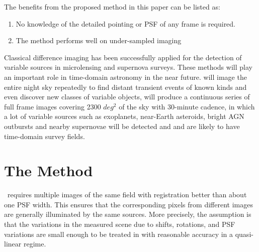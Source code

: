 The benefits from the proposed method in this paper can be listed as: 
\begin{enumerate}
\item No knowledge of the detailed pointing or PSF of any frame is required. 
\item The method performs well on under-sampled imaging
\end{enumerate}

Classical difference imaging has been successfully applied for the detection of variable sources in microlensing \citep{macho, ogle} and supernova \citep{sdss} surveys.
These methods will play an important role in time-domain astronomy in the near future. 
 \citep{lsst} will image the entire night sky repeatedly to find distant transient events of known kinds and even discover new classes of variable objects,  \citep{tess} will produce a continuous series of full frame images covering 2300 $deg^2$ of the sky with 30-minute cadence, in which a lot of variable sources such as exoplanets, near-Earth asteroids, bright AGN outbursts and nearby supernovae will be detected and  \citep{Euclid} and  \citep{wfirst} are likely to have time-domain survey fields.


\section{The Method} \label{method}
\cpmdiff\ requires multiple images of the same field with registration better than about one PSF width.
This ensures that the corresponding pixels from different images are generally illuminated by the same sources. 
More precisely, the assumption is that the variations in the measured scene due to shifts, rotations, and PSF variations are small enough to be treated in with reasonable accuracy in a quasi-linear regime.

